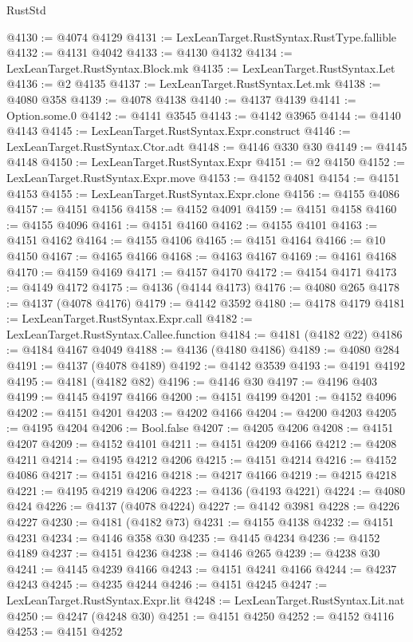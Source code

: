 \begin{lexlean}{RustStd}
\begin{coremodule}
@4130 := @4074 @4129
@4131 := LexLeanTarget.RustSyntax.RustType.fallible
@4132 := @4131 @4042
@4133 := @4130 @4132
@4134 := LexLeanTarget.RustSyntax.Block.mk
@4135 := LexLeanTarget.RustSyntax.Let
@4136 := @2 @4135
@4137 := LexLeanTarget.RustSyntax.Let.mk
@4138 := @4080 @358
@4139 := @4078 @4138
@4140 := @4137 @4139
@4141 := Option.some.{0}
@4142 := @4141 @3545
@4143 := @4142 @3965
@4144 := @4140 @4143
@4145 := LexLeanTarget.RustSyntax.Expr.construct
@4146 := LexLeanTarget.RustSyntax.Ctor.adt
@4148 := @4146 @330 @30
@4149 := @4145 @4148
@4150 := LexLeanTarget.RustSyntax.Expr
@4151 := @2 @4150
@4152 := LexLeanTarget.RustSyntax.Expr.move
@4153 := @4152 @4081
@4154 := @4151 @4153
@4155 := LexLeanTarget.RustSyntax.Expr.clone
@4156 := @4155 @4086
@4157 := @4151 @4156
@4158 := @4152 @4091
@4159 := @4151 @4158
@4160 := @4155 @4096
@4161 := @4151 @4160
@4162 := @4155 @4101
@4163 := @4151 @4162
@4164 := @4155 @4106
@4165 := @4151 @4164
@4166 := @10 @4150
@4167 := @4165 @4166
@4168 := @4163 @4167
@4169 := @4161 @4168
@4170 := @4159 @4169
@4171 := @4157 @4170
@4172 := @4154 @4171
@4173 := @4149 @4172
@4175 := @4136 (@4144 @4173)
@4176 := @4080 @265
@4178 := @4137 (@4078 @4176)
@4179 := @4142 @3592
@4180 := @4178 @4179
@4181 := LexLeanTarget.RustSyntax.Expr.call
@4182 := LexLeanTarget.RustSyntax.Callee.function
@4184 := @4181 (@4182 @22)
@4186 := @4184 @4167 @4049
@4188 := @4136 (@4180 @4186)
@4189 := @4080 @284
@4191 := @4137 (@4078 @4189)
@4192 := @4142 @3539
@4193 := @4191 @4192
@4195 := @4181 (@4182 @82)
@4196 := @4146 @30
@4197 := @4196 @403
@4199 := @4145 @4197 @4166
@4200 := @4151 @4199
@4201 := @4152 @4096
@4202 := @4151 @4201
@4203 := @4202 @4166
@4204 := @4200 @4203
@4205 := @4195 @4204
@4206 := Bool.false
@4207 := @4205 @4206
@4208 := @4151 @4207
@4209 := @4152 @4101
@4211 := @4151 @4209 @4166
@4212 := @4208 @4211
@4214 := @4195 @4212 @4206
@4215 := @4151 @4214
@4216 := @4152 @4086
@4217 := @4151 @4216
@4218 := @4217 @4166
@4219 := @4215 @4218
@4221 := @4195 @4219 @4206
@4223 := @4136 (@4193 @4221)
@4224 := @4080 @424
@4226 := @4137 (@4078 @4224)
@4227 := @4142 @3981
@4228 := @4226 @4227
@4230 := @4181 (@4182 @73)
@4231 := @4155 @4138
@4232 := @4151 @4231
@4234 := @4146 @358 @30
@4235 := @4145 @4234
@4236 := @4152 @4189
@4237 := @4151 @4236
@4238 := @4146 @265
@4239 := @4238 @30
@4241 := @4145 @4239 @4166
@4243 := @4151 @4241 @4166
@4244 := @4237 @4243
@4245 := @4235 @4244
@4246 := @4151 @4245
@4247 := LexLeanTarget.RustSyntax.Expr.lit
@4248 := LexLeanTarget.RustSyntax.Lit.nat
@4250 := @4247 (@4248 @30)
@4251 := @4151 @4250
@4252 := @4152 @4116
@4253 := @4151 @4252

\end{coremodule}
\end{lexlean}
